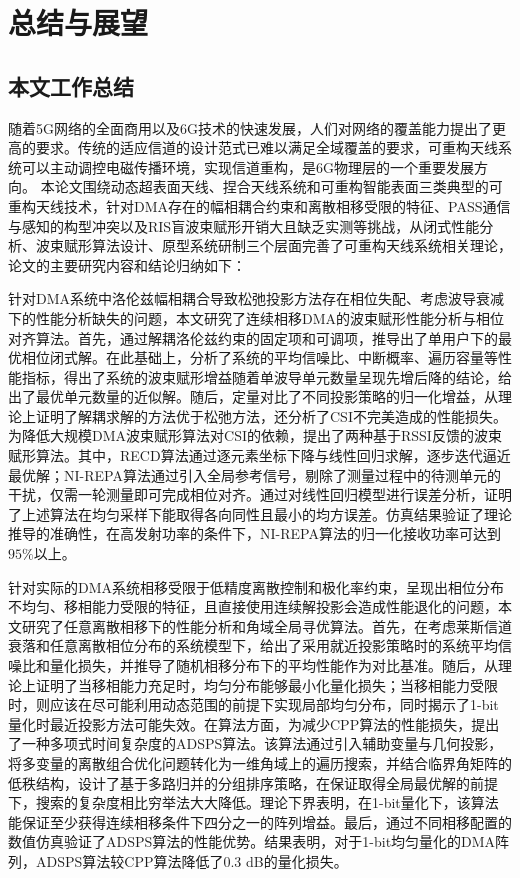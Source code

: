 \chapter{总结与展望}\label{ch:conclusion}

\section{本文工作总结}

随着5G网络的全面商用以及6G技术的快速发展，人们对网络的覆盖能力提出了更高的要求。传统的适应信道的设计范式已难以满足全域覆盖的要求，可重构天线系统可以主动调控电磁传播环境，实现信道重构，是6G物理层的一个重要发展方向。
本论文围绕动态超表面天线、捏合天线系统和可重构智能表面三类典型的可重构天线技术，针对DMA存在的幅相耦合约束和离散相移受限的特征、PASS通信与感知的构型冲突以及RIS盲波束赋形开销大且缺乏实测等挑战，从闭式性能分析、波束赋形算法设计、原型系统研制三个层面完善了可重构天线系统相关理论，论文的主要研究内容和结论归纳如下：

针对DMA系统中洛伦兹幅相耦合导致松弛投影方法存在相位失配、考虑波导衰减下的性能分析缺失的问题，本文研究了连续相移DMA的波束赋形性能分析与相位对齐算法。首先，通过解耦洛伦兹约束的固定项和可调项，推导出了单用户下的最优相位闭式解。在此基础上，分析了系统的平均信噪比、中断概率、遍历容量等性能指标，得出了系统的波束赋形增益随着单波导单元数量呈现先增后降的结论，给出了最优单元数量的近似解。随后，定量对比了不同投影策略的归一化增益，从理论上证明了解耦求解的方法优于松弛方法，还分析了CSI不完美造成的性能损失。为降低大规模DMA波束赋形算法对CSI的依赖，提出了两种基于RSSI反馈的波束赋形算法。其中，RECD算法通过逐元素坐标下降与线性回归求解，逐步迭代逼近最优解；NI-REPA算法通过引入全局参考信号，剔除了测量过程中的待测单元的干扰，仅需一轮测量即可完成相位对齐。通过对线性回归模型进行误差分析，证明了上述算法在均匀采样下能取得各向同性且最小的均方误差。仿真结果验证了理论推导的准确性，在高发射功率的条件下，NI-REPA算法的归一化接收功率可达到$95\%$以上。


针对实际的DMA系统相移受限于低精度离散控制和极化率约束，呈现出相位分布不均匀、移相能力受限的特征，且直接使用连续解投影会造成性能退化的问题，本文研究了任意离散相移下的性能分析和角域全局寻优算法。首先，在考虑莱斯信道衰落和任意离散相位分布的系统模型下，给出了采用就近投影策略时的系统平均信噪比和量化损失，并推导了随机相移分布下的平均性能作为对比基准。随后，从理论上证明了当移相能力充足时，均匀分布能够最小化量化损失；当移相能力受限时，则应该在尽可能利用动态范围的前提下实现局部均匀分布，同时揭示了1-bit量化时最近投影方法可能失效。在算法方面，为减少CPP算法的性能损失，提出了一种多项式时间复杂度的ADSPS算法。该算法通过引入辅助变量与几何投影，将多变量的离散组合优化问题转化为一维角域上的遍历搜索，并结合临界角矩阵的低秩结构，设计了基于多路归并的分组排序策略，在保证取得全局最优解的前提下，搜索的复杂度相比穷举法大大降低。理论下界表明，在1-bit量化下，该算法能保证至少获得连续相移条件下四分之一的阵列增益。最后，通过不同相移配置的数值仿真验证了ADSPS算法的性能优势。结果表明，对于1-bit均匀量化的DMA阵列，ADSPS算法较CPP算法降低了0.3 dB的量化损失。


